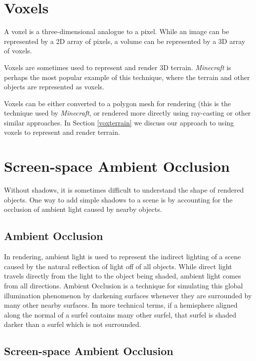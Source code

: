 \section{Voxels}

A voxel is a three-dimensional analogue to a pixel.
While an image can be represented by a 2D array of pixels, a volume can be represented by a 3D array of voxels.

Voxels are sometimes used to represent and render 3D terrain.
{\em Minecraft} is perhaps the most popular example of this technique, where the terrain and other objects are represented as voxels.

Voxels can be either converted to a polygon mesh for rendering (this is the technique used by {\em Minecraft}, or rendered more directly using ray-casting or other similar approaches.
In Section \ref{voxterrain} we discuss our approach to using voxels to represent and render terrain.


\section{Screen-space Ambient Occlusion}

Without shadows, it is sometimes difficult to understand the shape of rendered objects.
One way to add simple shadows to a scene is by accounting for the occlusion of ambient light caused by nearby objects.


\subsection{Ambient Occlusion}

In rendering, ambient light is used to represent the indirect lighting of a scene caused by the natural reflection of light off of all objects.
While direct light travels directly from the light to the object being shaded, ambient light comes from all directions.
Ambient Occlusion is a technique for simulating this global illumination phenomenon by darkening surfaces whenever they are surrounded by many other nearby surfaces.
In more technical terms, if a hemisphere aligned along the normal of a surfel contains many other surfel, that surfel is shaded darker than a surfel which is not surrounded.

\subsection{Screen-space Ambient Occlusion}


